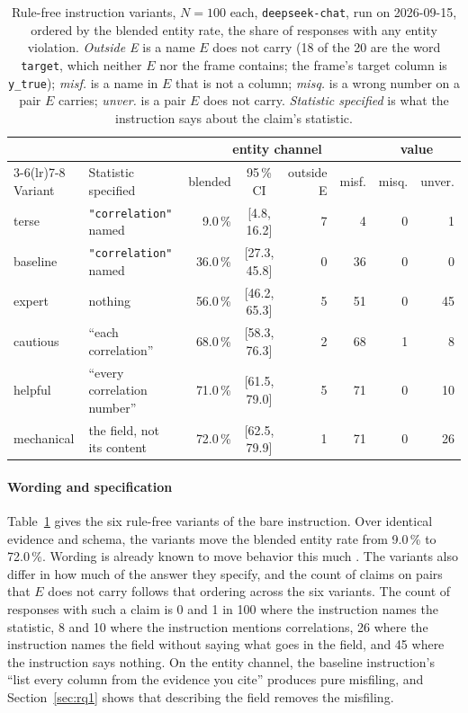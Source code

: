 \documentclass[10pt,twocolumn]{article}
\begin{document}
\begin{table}[!tp]
\caption{Rule-free instruction variants, $N=100$ each, \texttt{deepseek-chat},
run on 2026-09-15,
ordered by the blended entity rate, the share of responses with any entity
violation. \emph{Outside E} is a name $E$ does not carry (18 of the 20 are the
word \texttt{target}, which neither $E$ nor the frame contains; the frame's
target column is \texttt{y\_true}); \emph{misf.} is a name in $E$ that is not
a column; \emph{misq.} is a wrong number on a pair $E$ carries; \emph{unver.}
is a pair $E$ does not carry. \emph{Statistic specified} is what the
instruction says about the claim's statistic.}
\label{tab:sweep}
\centering
\begin{tabular}{@{}llrcrrrr@{}}
\toprule
& & \multicolumn{4}{c}{entity channel} & \multicolumn{2}{c}{value} \\
\cmidrule(lr){3-6}\cmidrule(lr){7-8}
Variant & Statistic specified & blended & 95\,\% CI & outside E & misf. & misq. & unver. \\
\midrule
terse      & \texttt{"correlation"} named   &  9.0\,\% & [4.8, 16.2]  & 7 &  4 & 0 & 1 \\
baseline   & \texttt{"correlation"} named   & 36.0\,\% & [27.3, 45.8] & 0 & 36 & 0 & 0 \\
expert     & nothing                        & 56.0\,\% & [46.2, 65.3] & 5 & 51 & 0 & 45 \\
cautious   & ``each correlation''           & 68.0\,\% & [58.3, 76.3] & 2 & 68 & 1 & 8 \\
helpful    & ``every correlation number''   & 71.0\,\% & [61.5, 79.0] & 5 & 71 & 0 & 10 \\
mechanical & the field, not its content     & 72.0\,\% & [62.5, 79.9] & 1 & 71 & 0 & 26 \\
\bottomrule
\end{tabular}
\end{table}

\paragraph{Wording and specification}
Table~\ref{tab:sweep} gives the six rule-free variants of the bare
instruction. Over identical evidence and schema, the variants move the blended
entity rate from 9.0\,\% to 72.0\,\%. Wording is already known to move
behavior this much \citep{sclar2024formatspread}. The variants also differ in
how much of the answer they specify, and the count of claims on pairs that
$E$ does not carry follows that ordering across the six variants. The count of
responses with such a claim is 0 and 1 in 100 where the instruction names the statistic, 8 and 10 where
the instruction mentions correlations, 26 where the instruction names the
field without saying what goes in the field, and 45 where the instruction says
nothing. On the entity channel, the baseline instruction's ``list every column
from the evidence you cite'' produces pure misfiling, and
Section~\ref{sec:rq1} shows that describing the field removes the misfiling.
\end{document}
